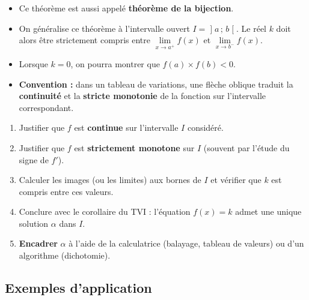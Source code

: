 \documentclass[11pt,a4paper]{article}
\newcommand{\intoo}[2]{\mathopen{]}#1\,;\,#2\mathclose{[}}
\newcommand{\limg}[2]{\lim\limits_{x\to #1^-}#2}
\newcommand{\limd}[2]{\lim\limits_{x\to #1^+}#2}
\begin{document}
\begin{remarque}
\begin{itemize}
  \item Ce théorème est aussi appelé \textbf{théorème de la bijection}.
  \item On généralise ce théorème à l'intervalle ouvert $I=\intoo{a}{b}$.
        Le réel $k$ doit alors être strictement compris entre
        $\limd{a}{f(x)}$ et $\limg{b}{f(x)}$.
  \item Lorsque $k=0$, on pourra montrer que $f(a)\times f(b)<0$.
  \item \textbf{Convention :} dans un tableau de variations, une flèche oblique
        traduit la \textbf{continuité} et la \textbf{stricte monotonie} de la
        fonction sur l'intervalle correspondant.
\end{itemize}
\end{remarque}

\begin{methode}[Étudier une équation $f(x)=k$ : existence, unicité, encadrement]
\begin{enumerate}
  \item Justifier que $f$ est \textbf{continue} sur l'intervalle $I$ considéré.
  \item Justifier que $f$ est \textbf{strictement monotone} sur $I$
        (souvent par l'étude du signe de $f'$).
  \item Calculer les images (ou les limites) aux bornes de $I$ et vérifier que
        $k$ est compris entre ces valeurs.
  \item Conclure avec le corollaire du TVI : l'équation $f(x)=k$ admet une
        unique solution $\alpha$ dans $I$.
  \item \textbf{Encadrer} $\alpha$ à l'aide de la calculatrice (balayage,
        tableau de valeurs) ou d'un algorithme (dichotomie).
\end{enumerate}
\end{methode}

\subsection{Exemples d'application}
\end{document}
